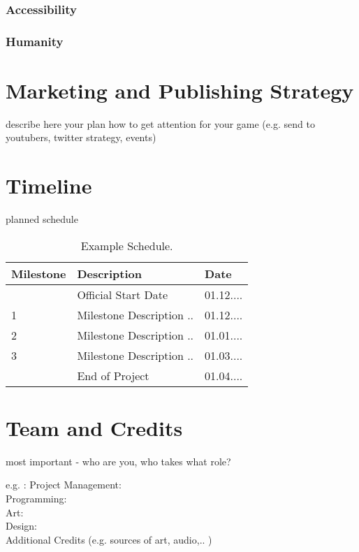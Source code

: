 \documentclass[a4paper]{scrreprt}
\begin{document}
\subsection{Accessibility}
\subsection{Humanity}



\chapter{Marketing and Publishing Strategy}

describe here your plan how to get attention for your game (e.g. send to youtubers, twitter strategy, events) 





\chapter{Timeline}

planned schedule 

\begin{table}[h]
\centering
\begin{tabular}{|l|l|l|}
\hline
Milestone & Description & Date \\\hline
& Official Start Date & 01.12.... \\
1 & Milestone Description ..  & 01.12.... \\
2 & Milestone Description ..  & 01.01.... \\
3 & Milestone Description ..  & 01.03.... \\
& End of Project & 01.04.... \\
\hline
\end{tabular}
\caption{\label{tab:schedule}Example Schedule.}
\end{table}




\chapter{Team and Credits}

most important - who are you, who takes what role? 

e.g. :
Project Management: \\
Programming: \\ 
Art: \\ 
Design: \\ 

Additional Credits (e.g. sources of art, audio,.. ) 


%
%
\end{document}
